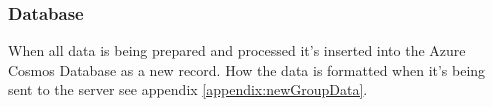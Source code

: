 

\subsubsection{Database}\label{sec:implServerGroupCreationDatabase}
When all data is being prepared and processed it's inserted into the Azure Cosmos Database as a new record.
How the data is formatted when it's being sent to the server see appendix \ref{appendix:newGroupData}.
